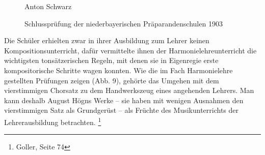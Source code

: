 \begin{wrapfigure}{r}{0.3\textwidth}
\caption{Anton Schwarz}
\end{wrapfigure}

\begin{figure}
\caption{Schlussprüfung der niederbayerischen Präparandenschulen 1903}
\end{figure}

Die Schüler erhielten zwar in ihrer Ausbildung zum Lehrer keinen
Kompositionsunterricht, dafür vermittelte ihnen der
Harmonielehreunterricht die wichtigsten tonsätzerischen Regeln, mit
denen sie in Eigenregie erste kompositorische Schritte wagen konnten.
Wie die im Fach Harmonielehre gestellten Prüfungen zeigen (Abb. 9),
gehörte das Umgehen mit dem vierstimmigen Chorsatz zu dem Handwerkszeug
eines angehenden Lehrers. Man kann deshalb August Högns Werke – sie
haben mit wenigen Ausnahmen den vierstimmigen Satz als Grundgerüst –
als Früchte des Musikunterrichts der Lehrerausbildung
betrachten. \footnote{Goller, Seite 74}
